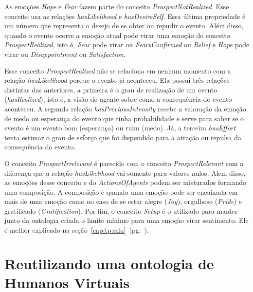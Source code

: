 As emoções \emph{Hope} e \emph{Fear} fazem parte do conceito
\emph{ProspectNotRealized}. Esse conceito usa as relações \emph{hasLikelihood}
e \emph{hasDesireSelf}. Essa última propriedade é um número que
representa o desejo de se obter ou repudir o evento. Além disso, quando o
evento ocorre a emoção atual pode virar uma emoção do conceito
\emph{ProspectRealized}, isto é, \emph{Fear} pode virar ou
\emph{FearsConfirmed} ou \emph{Relief} e \emph{Hope} pode virar ou
\emph{Disappointment} ou \emph{Satisfaction}.

Esse conceito \emph{ProspectRealized} não se relaciona em nenhum momento com a
relação \emph{hasLikelihood} porque o evento já aconteceu. Ela possui três
relações distintas das anteriores, a primeira é o grau de realização de um evento
(\emph{hasRealized}), isto é, a visão do agente sobre como a consequência do
evento aconteceu. A segunda relação \emph{hasPreviousIntensity} recebe a
valoração da emoção de medo ou esperança do evento que tinha probabilidade e
serve para saber se o evento é um evento bom (esperança) ou ruim (medo). Já, a
terceira \emph{hasEffort} tenta estimar o grau de esforço que foi dispendido
para a atração ou repulsa da consequência do evento.

O conceito \emph{ProspectIrrelevant} é parecido com o conceito
\emph{ProspectRelevant} com a diferença que a relação \emph{hasLikelihood} vai
somente para valores nulos. Alem disso, as emoções desse conceito e do
\emph{ActionsOfAgents} podem ser misturados formando uma composição. A
composição é quando uma emoção pode ser encaixada em mais de uma emoção como
no caso de se estar alegre (\emph{Joy}), orgulhoso (\emph{Pride}) e
gratificado (\emph{Gratification}). Por fim, o conceito \emph{Setup}
 é o
utilizado para manter junto da ontologia criada o limite mínimo para uma
emoção virar sentimento\dev{}. Ele é melhor explicado na
seção~\ref{cap:tp:cdu}~(pg.~\pageref{cap:tp:cdu}).


\section{Reutilizando uma ontologia de Humanos Virtuais} \label{cap:tp:ruodhv}

